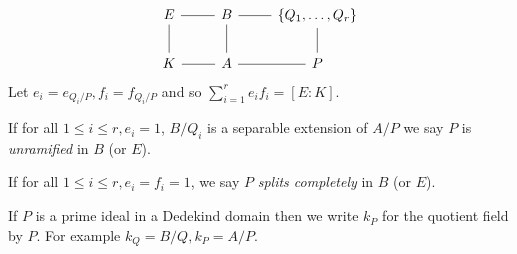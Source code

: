 \documentclass[a4paper]{article}
\begin{document}
\[
  \begin{tikzcd}
    E \ar[r, dash] \ar[d, dash] & B \ar[r, dash] \ar[d, dash] & \{Q_1, \dots, Q_r\} \ar[d, dash] \\
    K \ar[r, dash] & A \ar[r, dash] & P
  \end{tikzcd}
\]
Let \(e_i = e_{Q_i/P}, f_i = f_{Q_i/P}\) and so \(\sum_{i = 1}^r e_if_i = [E : K]\).

\begin{definition}
  If for all \(1 \leq i \leq r, e_i = 1\), \(B/Q_i\) is a separable extension of \(A/P\) we say \(P\) is \emph{unramified} in \(B\) (or \(E\)).

  If for all \(1 \leq i \leq r, e_i = f_i = 1\), we say \(P\) \emph{splits completely} in \(B\) (or \(E\)).
\end{definition}

\begin{notation}
  If \(P\) is a prime ideal in a Dedekind domain then we write \(k_P\) for the quotient field by \(P\). For example \(k_Q = B/Q, k_P = A/P\).
\end{notation}
\end{document}
